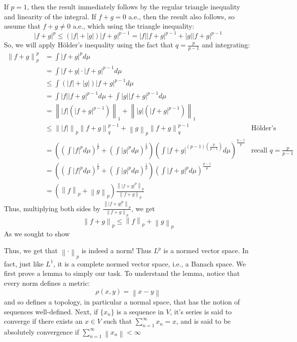 \documentclass[oneside]{book}
\begin{document}
\begin{Proof}
	If $p = 1$, then the result immediately follows by the regular triangle inequality and linearity of the integral. If
	$f + g = 0$ a.e., then the result also follows, so assume that $f + g \ne 0$ a.e., which using the triangle
	inequality:
	\[
		|f+g|^p \le (|f| + |g|)|f+g|^{p-1} = |f||f+g|^{p-1} + |g||f+g|^{p-1}
	\]
	So, we will apply H\"older's inequality using the fact that $q = \frac{p}{p-1}$ and integrating:
	\begin{align*}
		\left\|f+g\right\|_p^p &= \int |f+g|^p d\mu\\
								  &= \int |f+g|\cdot |f+g|^{p-1}d\mu\\
								  &\le \int(|f|+|g|)|f+g|^{p-1}d\mu\\
								  &= \int |f||f+g|^{p-1}d\mu
								  + \int|g||f+g|^{p-1}d\mu\\
								  &= \left\| |f|(|f+g|^{p-1})\right\|_1 + \left\| |g|(|f+g|^{p-1})\right\|_1\\
								  &\le \left\| |f|\right\|_p\left\|f+g\right\|_q^{p-1}
								  + \left\|g\right\|_p\left\|f+g\right\|_q^{p-1}
								  & \text{H\"older's Inequality}\\
								  &=
								  \left(\left(\int|f|^p d\mu\right)^{\frac{1}{p}}
									  + \left(\int|g|^p d\mu\right)^{\frac{1}{p}}\right)\left(\int
								  |f+g|^{(p-1)\left(\frac{p}{p-1}\right)}d\mu\right)^{\frac{p-1}{p}}
								  &\text{recall }q = \frac{p}{p-1}\\
								  &=
								  \left(\left(\int|f|^p d\mu\right)^{\frac{1}{p}}
									  + \left(\int|g|^p d\mu\right)^{\frac{1}{p}}\right)\left(\int
								  |f+g|^{p}d\mu\right)^{\frac{p-1}{p}}\\
								  &= (\left\|f\right\|_p + \left\|g\right\|_p)
								  \frac{\left\| |f+g|^p\right\|_p}{\left\|
								  f+g\right\|_p}
	\end{align*}
	Thus, multiplying both sides by $\frac{\left\| |f+g|^p\right\|_p}{\left\| f+g\right\|_p}$, we get
	\[
		\left\| f+g\right\|_p \le \left\|f\right\|_p + \left\|g\right\|_p
	\]
	As we sought to show
\end{Proof}


Thus, we get that $\left\| \cdot \right\|_p$ is indeed a norm! Thus $L^p$ is a normed vector space. In fact, just like
$L^1$, it is a complete normed vector space, i.e., a Banach space. We first prove a lemma to simply our task. To
understand the lemma, notice that every norm defines a metric:
\[
	\rho(x,y) = \left\| x-y\right\|
\]
and so defines a topology, in particular a normal space, that has the notion of sequences well-defined. Next, if
$\{x_n\}$ is a sequence in $V$, it's series is said to converge if there exists an $x \in V$ such that
$\sum_{n=1}^\infty x_n = x$, and is said to be absolutely convergence if $\sum_{n=1}^\infty \left\| x_n\right\|
< \infty$
\end{document}
